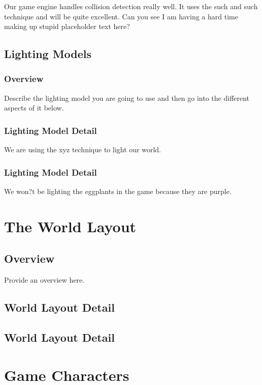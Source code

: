 \documentclass[a4paper]{report}
\begin{document}
			Our game engine handles collision detection really well.  It uses the such and such technique and will be quite excellent.  Can you see I am having a hard time making up stupid placeholder text here?

	\section{Lighting Models}

		\subsection{Overview}

			Describe the lighting model you are going to use and then go into the different aspects of it below.

		\subsection{Lighting Model Detail}

	We are using the xyz technique to light our world.

		\subsection{Lighting Model Detail}

	We won?t be lighting the eggplants in the game because they are purple.

\chapter{The World Layout}

	\section{Overview}

		Provide an overview here.

	\section{World Layout Detail}

	\section{World Layout Detail}

\chapter{Game Characters}
\end{document}
